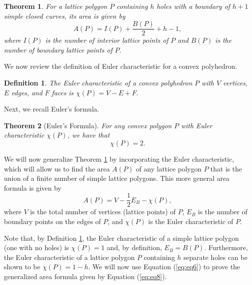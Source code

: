 \documentclass[12pt]{article}
\newtheorem{theorem}{Theorem}[section]
\newtheorem{definition}{Definition}[section]
\begin{document}
	\begin{theorem}\label{th:th1}
		For a lattice polygon $P$ containing $h$ holes with a boundary of $h+1$ simple closed curves, its area is given by
		\begin{equation*}
		A(P) = I(P) + \frac{B(P)}{2} + h - 1,
		\end{equation*}
		where $I(P)$ is the number of interior lattice points of $P$ and $B(P)$ is the number of boundary lattice points of $P$.
	\end{theorem}
	
	We now review the definition of Euler characteristic for a convex polyhedron.
	
	\begin{definition}\label{df:df1}
		The Euler characteristic of a convex polyhedron $P$ with $V$ vertices, $E$ edges, and $F$ faces is
		$\chi(P) = V - E + F.$
	\end{definition}
	
	Next, we recall Euler’s formula.
	
	\begin{theorem}[Euler’s Formula]\label{th:th2}
		For any convex polygon $P$ with Euler characteristic $\chi(P)$, we have that
		\begin{equation}\label{eq:eq6}
		\chi(P) = 2.
		\end{equation}
	\end{theorem}
	
	We will now generalize Theorem \textcolor{blue}{\ref{th:th1}} by incorporating the Euler characteristic, which will allow us to find the area $A(P)$ of any lattice polygon $P$ that is the union of a finite number of simple lattice polygons. This more general area formula is given by
	\begin{equation}\label{eq:eq8}
	A(P) = V - \frac{1}{2}E_B - \chi(P),
	\end{equation}
	where $V$ is the total number of vertices (lattice points) of $P$, $E_B$ is the number of boundary points on the edges of $P$, and $\chi(P)$ is the Euler characteristic of $P$.
	
	Note that, by Definition \textcolor{blue}{\ref{df:df1}}, the Euler characteristic of a simple lattice polygon (one with no holes) is $\chi(P) = 1$ and, by definition, $E_B = B(P)$. Furthermore, the Euler characteristic of a lattice polygon $P$ containing $h$ separate holes can be shown to be $\chi(P) = 1-h$. We will now use Equation (\textcolor{blue}{\ref{eq:eq6}}) to prove the generalized area formula given by Equation (\textcolor{blue}{\ref{eq:eq8}}).
	
\end{document}
